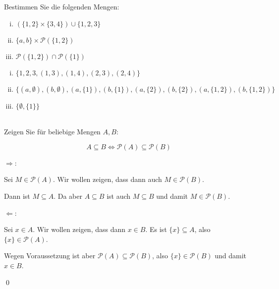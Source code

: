 \newcommand{\printpraesenzlsg}{false}
\newcommand{\printloesungen}{true}
\newcommand{\printbewertungen}{false}
\newcommand{\blattnummer}{3}



\iforiginal{}

	

Bestimmen Sie die folgenden Mengen:
\begin{enumerate}[(i)]
  \item $(\{1,2\}\times\{3,4\})\cup\{1,2,3\}$
  \item $\{a,b\}\times\mathscr{P}(\{1,2\})$
  \item $\mathscr{P}(\{1,2\})\cap\mathscr{P}(\{1\})$
\end{enumerate}

\begin{loesung}
\begin{enumerate}[(i)]
  \item $\{1,2,3,(1,3),(1,4),(2,3),(2,4)\}$
  \item $\{(a,\emptyset),(b,\emptyset),(a,\{1\}),(b,\{1\}),(a,\{2\}),(b,\{2\}),(a,\{1,2\}),(b,\{1,2\})\}$
  \item $\{\emptyset, \{1\}\}$
  
\end{enumerate}
\end{loesung}

\\
Zeigen Sie für beliebige Mengen $A,B$:

  \[A\subseteq B\Leftrightarrow \mathscr{P}(A)\subseteq\mathscr{P}(B)\]


\begin{loesung}
  \glqq$\Rightarrow$\grqq:

  Sei $M\in\mathscr{P}(A)$. Wir wollen zeigen, dass dann auch $M\in\mathscr{P}(B)$.
  
  Dann ist $M\subseteq A$. Da aber $A\subseteq B$ ist auch $M\subseteq B$ und damit $M\in\mathscr{P}(B)$.

  \glqq$\Leftarrow$\grqq:

  Sei $x\in A$. Wir wollen zeigen, dass dann $x\in B$. Es ist $\{x\}\subseteq A$, also $\{x\}\in\mathscr{P}(A)$.
  
  Wegen Voraussetzung ist aber $\mathscr{P}(A)\subseteq\mathscr{P}(B)$, also $\{x\}\in\mathscr{P}(B)$ und damit $x\in B$. 

  \qed
\end{loesung}


